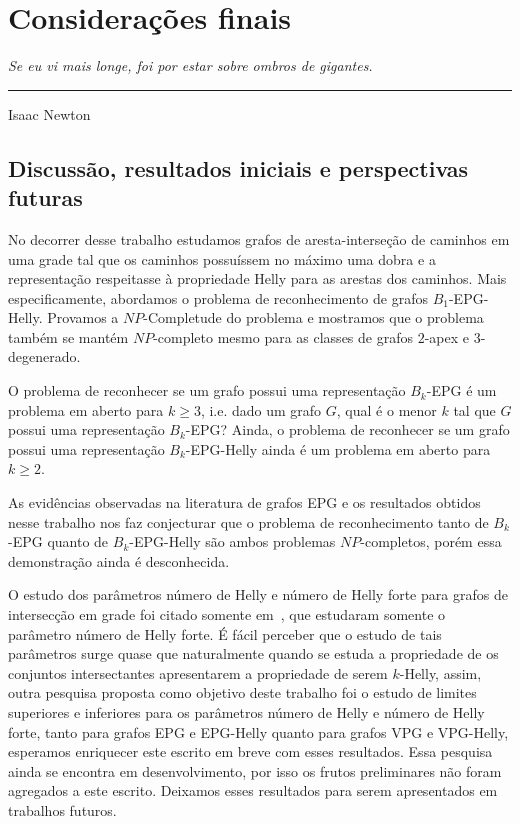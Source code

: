 \chapter{Considerações finais}\label{conclusao}

\begin{flushright}
\begin{minipage}[t][0cm][b]{0.47\textwidth}
\emph{
Se eu vi mais longe, foi por estar sobre ombros de gigantes.}
\end{minipage}

\rule[0cm]{7cm}{0.03cm}%

Isaac Newton
\end{flushright}

\section{Discussão, resultados iniciais e perspectivas futuras}

No decorrer desse trabalho estudamos grafos de aresta-interseção de caminhos em uma grade tal que os caminhos possuíssem no máximo uma dobra e a representação respeitasse à propriedade Helly para as arestas dos caminhos. Mais especificamente, abordamos o problema de reconhecimento de grafos $B_1$-EPG-Helly. Provamos a $NP$-Completude do problema e mostramos que o problema também se mantém $NP$-completo mesmo para as classes de grafos $2$-apex e $3$-degenerado.

O problema de reconhecer se um grafo possui uma representação $B_{k}$-EPG é um problema em aberto para $k\geq 3$, i.e. dado um grafo $G$, qual é o menor $k$ tal que $G$ possui uma representação $B_{k}$-EPG? Ainda, o problema de reconhecer se um grafo possui uma representação $B_{k}$-EPG-Helly ainda é um problema em aberto para $k\geq 2$.

As evidências observadas na literatura de grafos EPG e os resultados obtidos nesse trabalho nos faz conjecturar que o problema de reconhecimento tanto de $B_{k}$-EPG quanto de $B_{k}$-EPG-Helly são ambos problemas $NP$-completos, porém essa demonstração ainda é desconhecida.

O estudo dos parâmetros número de Helly e número de Helly forte para grafos de intersecção em grade foi citado somente em~\cite{golumbic2009, golumbic2013}, que estudaram somente o parâmetro número de Helly forte.
É fácil perceber que o estudo de tais parâmetros surge quase que naturalmente quando se estuda a propriedade de os conjuntos intersectantes apresentarem a propriedade de serem $k$-Helly, assim, outra pesquisa proposta como objetivo deste trabalho foi o estudo de limites superiores e inferiores para os parâmetros número de Helly e número de Helly forte, tanto para grafos EPG e EPG-Helly quanto para grafos VPG e VPG-Helly, esperamos enriquecer este escrito em breve com esses resultados. Essa pesquisa ainda se encontra em desenvolvimento, por isso os frutos preliminares não foram agregados a este escrito. Deixamos esses resultados para serem apresentados em trabalhos futuros.

